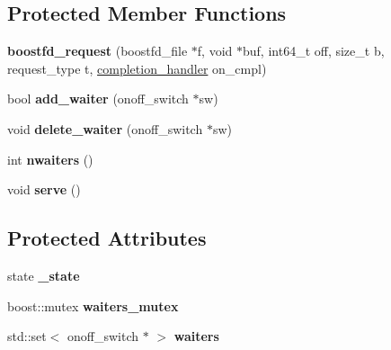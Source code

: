 \subsection*{Protected Member Functions}
\begin{CompactItemize}
\item 
\hypertarget{group__iolayer_gfa21a04d9716110f605b9739aad2281c}{
\textbf{boostfd\_\-request} (boostfd\_\-file $\ast$f, void $\ast$buf, int64\_\-t off, size\_\-t b, request\_\-type t, \hyperlink{classcompletion__handler}{completion\_\-handler} on\_\-cmpl)}
\label{group__iolayer_gfa21a04d9716110f605b9739aad2281c}

\item 
\hypertarget{group__iolayer_ga8f9033492c4dc7596ef77c56fff15d6}{
bool \textbf{add\_\-waiter} (onoff\_\-switch $\ast$sw)}
\label{group__iolayer_ga8f9033492c4dc7596ef77c56fff15d6}

\item 
\hypertarget{group__iolayer_g1e8576c3e916fbac0ea8c28551c9c4ab}{
void \textbf{delete\_\-waiter} (onoff\_\-switch $\ast$sw)}
\label{group__iolayer_g1e8576c3e916fbac0ea8c28551c9c4ab}

\item 
\hypertarget{group__iolayer_gf0a44abb0c368e4c859eb8abf48a52d2}{
int \textbf{nwaiters} ()}
\label{group__iolayer_gf0a44abb0c368e4c859eb8abf48a52d2}

\item 
\hypertarget{group__iolayer_g91d7f4fb290408511cb6d8c9f5156d87}{
void \textbf{serve} ()}
\label{group__iolayer_g91d7f4fb290408511cb6d8c9f5156d87}

\end{CompactItemize}
\subsection*{Protected Attributes}
\begin{CompactItemize}
\item 
\hypertarget{group__iolayer_g68db8fb13fe5bdb92c44af64db4b8e23}{
state \textbf{\_\-state}}
\label{group__iolayer_g68db8fb13fe5bdb92c44af64db4b8e23}

\item 
\hypertarget{group__iolayer_gc709fb7a7f61caa12ad0036e1d1ee8e8}{
boost::mutex \textbf{waiters\_\-mutex}}
\label{group__iolayer_gc709fb7a7f61caa12ad0036e1d1ee8e8}

\item 
\hypertarget{group__iolayer_g8ea60a2547e82af4ca15f3314a552d2c}{
std::set$<$ onoff\_\-switch $\ast$ $>$ \textbf{waiters}}
\label{group__iolayer_g8ea60a2547e82af4ca15f3314a552d2c}

\end{CompactItemize}
